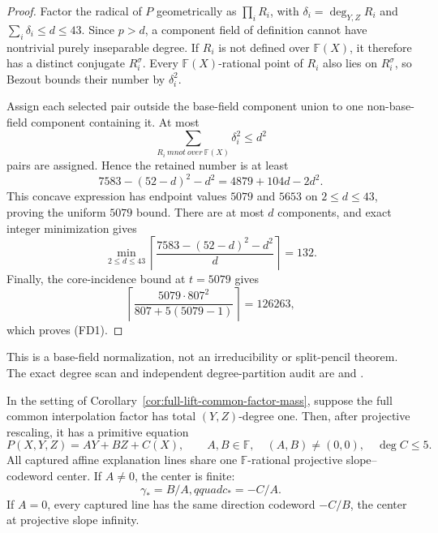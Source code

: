 \documentclass[11pt,a4paper]{amsart}
\numberwithin{equation}{section}
\theoremstyle{remark}
\newcommand{\F}{\mathbb F}\newcommand{\B}{\mathbb B}\newcommand{\K}{\mathbb K}\newcommand{\Z}{\mathbb Z}
\begin{document}
\begin{proof}
Factor the radical of $P$ geometrically as $\prod_iR_i$, with
$\delta_i=\deg_{Y,Z}R_i$ and $\sum_i\delta_i\le d\le43$.  Since
$p>d$, a component field of definition cannot have nontrivial purely
inseparable degree.  If $R_i$ is not defined over $\F(X)$, it therefore
has a distinct conjugate $R_i^\sigma$.  Every $\F(X)$-rational point of
$R_i$ also lies on $R_i^\sigma$, so Bezout bounds their number by
$\delta_i^2$.

Assign each selected pair outside the base-field component union to one
non-base-field component containing it.  At most
\[
 \sum_{R_i\ {
m not\ over}\ \F(X)}\delta_i^2\le d^2
\]
pairs are assigned.  Hence the retained number is at least
\[
 7583-(52-d)^2-d^2=4879+104d-2d^2.
\]
This concave expression has endpoint values $5079$ and $5653$ on
$2\le d\le43$, proving the uniform $5079$ bound.  There are at most $d$
components, and exact integer minimization gives
\[
 \min_{2\le d\le43}
 \left\lceil\frac{7583-(52-d)^2-d^2}{d}\right\rceil=132.
\]
Finally, the core-incidence bound at $t=5079$ gives
\[
 \left\lceil
 \frac{5079\cdot807^2}{807+5(5079-1)}
 \right\rceil=126263,
\]
which proves (FD1).
\end{proof}

\begin{remark}
This is a base-field normalization, not an irreducibility or split-pencil
theorem.  The exact degree scan and independent degree-partition audit are
and
.
\end{remark}

\begin{corollary}
\label{cor:full-lift-linear-factor-projective-star}
In the setting of Corollary~\ref{cor:full-lift-common-factor-mass}, suppose
the full common interpolation factor has total $(Y,Z)$-degree one.  Then,
after projective rescaling, it has a primitive equation
\[
 P(X,Y,Z)=AY+BZ+C(X),
 \qquad A,B\in\F,\quad (A,B)\ne(0,0),\quad \deg C\le5. \tag{LS1}
\]
All captured affine explanation lines share one $\F$-rational projective
slope--codeword center.  If $A\ne0$, the center is finite:
\[
 \gamma_*=B/A,qquad c_*=-C/A.
\]
If $A=0$, every captured line has the same direction codeword $-C/B$, the
center at projective slope infinity.
\end{corollary}
\end{document}
